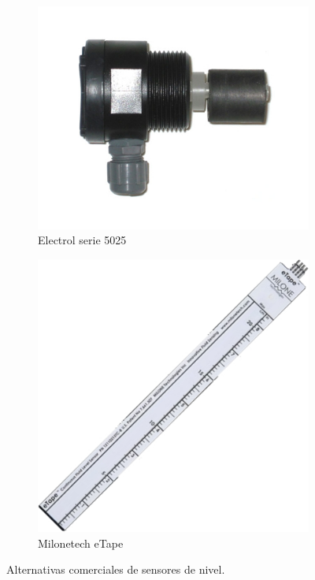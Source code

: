\begin{figure}[h]
\centering
\begin{subfigure}{.5\textwidth}
  \centering
    \includegraphics[height=.15\textheight]{./Figures/sensor_nivel_1}
\caption[]{Electrol serie 5025 \protect\footnotemark}	
	\label{fig:Sensor de nivel1}
	
\end{subfigure}%
\begin{subfigure}{.5\textwidth}
  \centering
  \includegraphics[height=.15\textheight]{./Figures/sensor_nivel_3}
  	\caption[]{Milonetech eTape \protect\footnotemark}
  \label{fig:Sensor de nivel2}
\end{subfigure}
\caption[Alternativas comerciales de sensores de nivel.]{Alternativas comerciales de sensores de nivel.}
\label{fig:sensoresnivel}
\end{figure}


